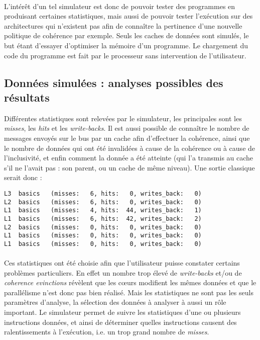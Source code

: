 \paragraph{}
L'intérêt d'un tel simulateur est donc de pouvoir tester des programmes en produisant certaines statistiques, mais aussi de pouvoir tester l'exécution sur des architectures qui n'existent pas afin de connaître la pertinence d'une nouvelle politique de cohérence par exemple. Seuls les caches de données sont simulés, le but étant d'essayer d'optimiser la mémoire d'un programme. Le chargement du code du programme est fait par le processeur sans intervention de l'utilisateur.

\subsection{Données simulées : analyses possibles des résultats}

Différentes statistiques sont relevées par le simulateur, les principales sont les \emph{misses}, les \emph{hits} et les \emph{write-backs}. Il est aussi possible de connaître le nombre de messages envoyés sur le bus par un cache afin d'effectuer la cohérence, ainsi que le nombre de données qui ont été invalidées à cause de la cohérence ou à cause de l'inclusivité, et enfin comment la donnée a été atteinte (qui l'a transmis au cache s'il ne l'avait pas : son parent, ou un cache de même niveau). Une sortie classique serait donc :

\begin{lstlisting}
L3  basics   (misses:   6, hits:   0, writes_back:   0)
L2  basics   (misses:   6, hits:   0, writes_back:   0)
L1  basics   (misses:   4, hits:  44, writes_back:   1)
L1  basics   (misses:   6, hits:  42, writes_back:   2)
L2  basics   (misses:   0, hits:   0, writes_back:   0)
L1  basics   (misses:   0, hits:   0, writes_back:   0)
L1  basics   (misses:   0, hits:   0, writes_back:   0)
\end{lstlisting}

\paragraph{}
Ces statistiques ont été choisie afin que l'utilisateur puisse constater certains problèmes particuliers. En effet un nombre trop élevé de \emph{write-backs} et/ou de \emph{coherence evinctions} révèlent que les c\oe urs modifient les mêmes données et que le parallélisme n'est donc pas bien réalisé. Mais les statistiques ne sont pas les seuls paramètres d'analyse, la sélection des données à analyser à aussi un rôle important. Le simulateur permet de suivre les statistiques d'une ou plusieurs instructions données, et ainsi de déterminer quelles instructions causent des ralentissements à l'exécution, i.e. un trop grand nombre de \emph{misses}.

